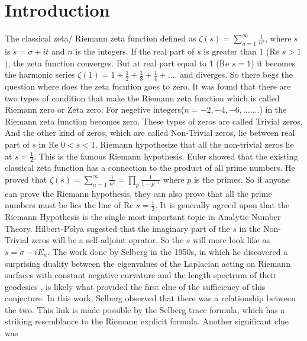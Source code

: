 \documentclass[12pt]{report}
\newcommand*{\1}{\hspace{1pt}}
\begin{document}
    \tableofcontents

    \newpage
    \chapter{Introduction}
    The classical zeta/ Riemann zeta function defined as $\zeta(s) = \sum _{n=1}^{\infty} \frac{1}{n^{s}}$\cite{s3}, where $s$ is $s=\sigma + it$ and $n$ is the integers. If the real part of $s$ is greater
    than 1 (Re $s > 1$), the zeta function converges. But at real part equal to 1 (Re $s = 1$) it becomes the harmonic series $\zeta(1) = 1 + \frac{1}{2} + \frac{1}{3} + 
    \frac{1}{4} + ....$ and diverges. So there begs the question where does the zeta fucntion goes to zero. It was found that there are two types of condition that make 
    the Riemann zeta function which is called Riemann zero or Zeta zero. For negetive integers($n=-2,-4,-6,.......$) in the Riemann zeta function becomes zero. These types of zeros are called
    Trivial zeros. And the other kind of zeros, which are called Non-Trivial zeros, lie between real part of $s$ in Re $0<s<1$. Riemann hypothesize that all the non-trivial zeros
    lie at $s=\frac{1}{2}$. This is the famous Riemann hypothesis. Euler showed that the existing classical zeta function has a connection to the product of all prime numbers.
    He proved that $\zeta(s) = \sum_{n=1}^{\infty} \frac{1}{n^{s}} = \prod _{p} \frac{1}{1-p^{-s}}$ where $p$ is the primes. So if anyone can prove the Riemann hypothesis, they
    can also prove that all the prime numbers must be lies the line of Re $ s = \frac{1}{2}$. It is generally agreed upon that the Riemann Hypothesis is the single most important topic in 
    Analytic Number Theory\cite{s27,s28,s29,s30}. Hilbert-P$\acute{o}$lya sugested that the imaginary part of the $s$ in the Non-Trivial
    zeros will be a self-adjoint oprator\cite{s31,s32,s33}. So the $s$ will more look like as $s=\sigma - iE_{n}$. The work done by Selberg in the 1950s, in which he
    discovered a surprising duality between the eigenvalues of the Laplacian acting on Riemann surfaces with constant negative curvature and the length spectrum of their
    geodesics \cite{s34}, is likely what provided the first clue of the sufficiency of this conjecture. In this work, Selberg observed that there was a relationship between 
    the two. This link is made possible by the Selberg trace formula, which has a striking resemblance to the Riemann explicit formula. Another significant clue was 
\end{document}

